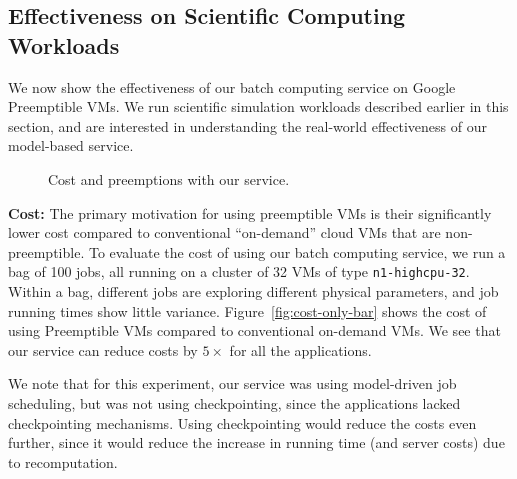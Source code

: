 \documentclass[sigconf]{acmart} %
\newcommand{\myfigspace}[0]{-0.45cm}
\newcommand{\subsecspace}[0]{-0.20cm}
\begin{document}
\vspace*{\subsecspace}
\subsection{Effectiveness on Scientific Computing Workloads}

We now show the effectiveness of our batch computing service on Google Preemptible VMs.
We run scientific simulation workloads described earlier in this section, and are interested in understanding the real-world effectiveness of our model-based service.

\begin{figure}[t]
  \vspace*{\myfigspace}
  \centering
\hfill
{}
\label{fig:service-all}
\vspace*{-0.4cm}
\caption{Cost and preemptions with our service.}
\vspace*{\myfigspace}
\end{figure}  

\noindent \textbf{Cost:}
The primary motivation for using preemptible VMs is their significantly lower cost compared to conventional ``on-demand'' cloud VMs that are non-preemptible.
To evaluate the cost of using our batch computing service, we run a bag of 100 jobs, all running on a cluster of 32 VMs of type \texttt{n1-highcpu-32}. 
Within a bag, different jobs are exploring different physical parameters, and job running times show little variance. 
Figure~\ref{fig:cost-only-bar} shows the cost of using Preemptible VMs compared to conventional on-demand VMs.
We see that our service can reduce costs by $5\times$ for all the applications. 

We note that for this experiment, our  service was using model-driven job scheduling, but was not using checkpointing, since the applications lacked checkpointing mechanisms.
Using checkpointing would reduce the costs even further, since it would reduce the increase in running time (and server costs) due to recomputation.
\end{document}
